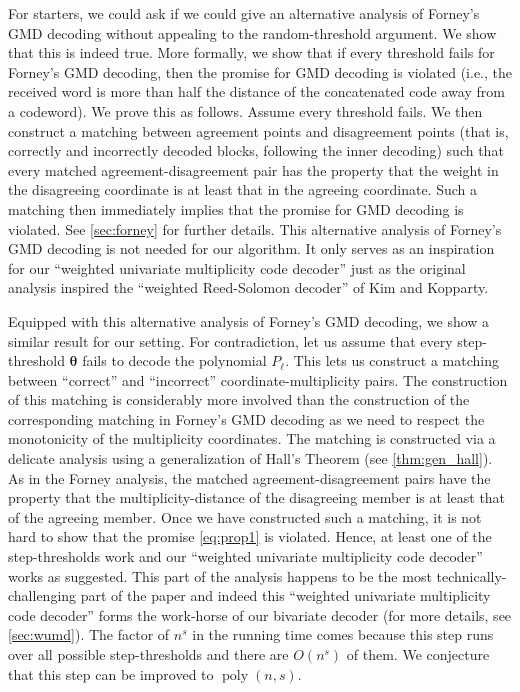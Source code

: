 \documentclass{theoretics}
\def\poly{\operatorname{poly}}
\newcommand{\thetabar}{{\boldsymbol{\theta}}}
\begin{document}
	For starters, we could ask if we could give an alternative analysis of
	Forney's GMD decoding without appealing to the random-threshold
	argument. We show that this is indeed true. More formally, we show
	that if every threshold fails for Forney's GMD decoding, then the
	promise for GMD decoding is violated (i.e., the received word is more than half the distance of the concatenated code away from a codeword). We prove this as follows. Assume
	every threshold fails. We then construct a matching between agreement
	points and disagreement points (that is, correctly and incorrectly decoded blocks, following the inner decoding) such that every matched
	agreement-disagreement pair has the property that the weight in the
	disagreeing coordinate is at least that in the agreeing
	coordinate. Such a matching then immediately implies that the promise
	for GMD decoding is violated. See \cref{sec:forney} for further
	details. This alternative analysis of Forney's GMD decoding is not
	needed for our algorithm. It only serves as an inspiration for our
	``weighted univariate multiplicity code decoder'' just as the original
	analysis inspired the ``weighted Reed-Solomon decoder'' of Kim and
	Kopparty.
	
	Equipped with this alternative analysis of Forney's GMD decoding, we
	show a similar result for our setting. For contradiction, let us
	assume that every step-threshold $\thetabar$ fails to decode the
	polynomial $P_\ell$. This lets us construct a matching between
	``correct'' and ``incorrect'' coordinate-multiplicity pairs. The
	construction of this matching is considerably more involved than the
	construction of the corresponding matching in Forney's GMD decoding as
	we need to respect the monotonicity of the multiplicity
	coordinates. The matching is constructed via a delicate analysis using
	a generalization of Hall's Theorem (see \cref{thm:gen_hall}).  As in
	the Forney analysis, the matched agreement-disagreement pairs have the
	property that the multiplicity-distance of the disagreeing member is
	at least that of the agreeing member.  Once we have constructed such a
	matching, it is not hard to show that the promise \eqref{eq:prop1} is
	violated. Hence, at least one of the step-thresholds work and our
	``weighted univariate multiplicity code decoder'' works as
	suggested. This part of the analysis happens to be the most
	technically-challenging part of the paper and indeed this ``weighted univariate
	multiplicity code decoder'' forms the work-horse of our bivariate
	decoder (for more details, see \cref{sec:wumd}). The factor of $n^s$
	in the running time comes because this step runs over all possible
	step-thresholds and there are $O(n^s)$ of them. We conjecture that
	this step can be improved to $\poly(n,s)$. 
	
\end{document}
